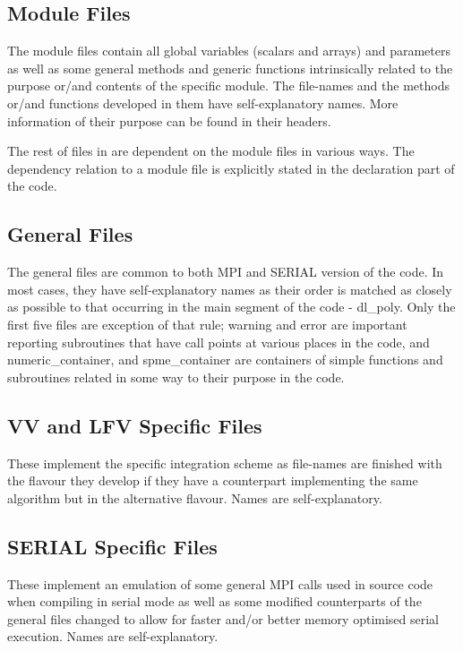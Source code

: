 \subsection{Module Files}

The \D module files contain all global variables (scalars and
arrays) and parameters as well as some general methods and generic
functions intrinsically related to the purpose or/and contents of
the specific module.  The file-names and the methods or/and
functions developed in them have self-explanatory names.  More
information of their purpose can be found in their headers.

The rest of files in \D are dependent on the module files in
various ways.  The dependency relation to a module file is
explicitly stated in the declaration part of the code.

\subsection{General Files}

The \D general files are common to both MPI and SERIAL version of
the code.  In most cases, they have self-explanatory names as their
order is matched as closely as possible to that occurring in the
main segment of the code - {\sc dl\_poly}.  Only the first five
files are exception of that rule; {\sc warning} and {\sc error} are
important reporting subroutines that have call points at various
places in the code, and {\sc numeric\_container}, and
{\sc spme\_container} are containers of simple functions and
subroutines related in some way to their purpose in the code.

\subsection{VV and LFV Specific Files}

These implement the specific integration scheme as file-names are
finished with the flavour they develop if they have a counterpart
implementing the same algorithm but in the alternative flavour.
Names are self-explanatory.

\subsection{SERIAL Specific Files}

These implement an emulation of some general MPI calls used in \D
source code when compiling in serial mode as well as some modified
counterparts of the general files changed to allow for faster and/or
better memory optimised serial execution.  Names are
self-explanatory.

